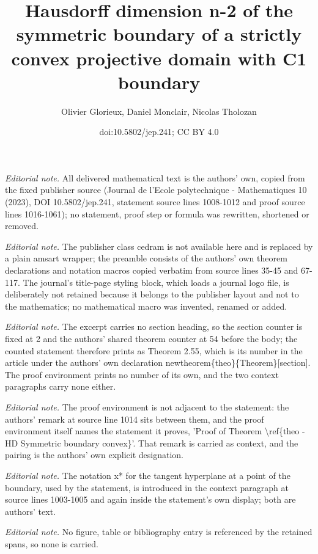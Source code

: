\documentclass[10pt,a4paper]{amsart}
\title{Hausdorff dimension n-2 of the symmetric boundary of a strictly convex projective domain with C1 boundary}
\author{Olivier Glorieux, Daniel Monclair, Nicolas Tholozan}
\date{doi:10.5802/jep.241; CC BY 4.0}
\theoremstyle{definition}
\begin{document}
\maketitle
\setcounter{section}{2}
\setcounter{theo}{54}
\noindent\textit{Editorial note.} All delivered mathematical text is the authors' own, copied from the fixed publisher source (Journal de l'Ecole polytechnique - Mathematiques 10 (2023), DOI 10.5802/jep.241, statement source lines 1008-1012 and proof source lines 1016-1061); no statement, proof step or formula was rewritten, shortened or removed.\par\medskip
\noindent\textit{Editorial note.} The publisher class cedram is not available here and is replaced by a plain amsart wrapper; the preamble consists of the authors' own theorem declarations and notation macros copied verbatim from source lines 35-45 and 67-117. The journal's title-page styling block, which loads a journal logo file, is deliberately not retained because it belongs to the publisher layout and not to the mathematics; no mathematical macro was invented, renamed or added.\par\medskip
\noindent\textit{Editorial note.} The excerpt carries no section heading, so the section counter is fixed at 2 and the authors' shared theorem counter at 54 before the body; the counted statement therefore prints as Theorem 2.55, which is its number in the article under the authors' own declaration newtheorem\{theo\}\{Theorem\}[section]. The proof environment prints no number of its own, and the two context paragraphs carry none either.\par\medskip
\noindent\textit{Editorial note.} The proof environment is not adjacent to the statement: the authors' remark at source line 1014 sits between them, and the proof environment itself names the statement it proves, 'Proof of Theorem \textbackslash{}ref\{theo - HD Symmetric boundary convex\}'. That remark is carried as context, and the pairing is the authors' own explicit designation.\par\medskip
\noindent\textit{Editorial note.} The notation x* for the tangent hyperplane at a point of the boundary, used by the statement, is introduced in the context paragraph at source lines 1003-1005 and again inside the statement's own display; both are authors' text.\par\medskip
\noindent\textit{Editorial note.} No figure, table or bibliography entry is referenced by the retained spans, so none is carried.\par\medskip
\end{document}
